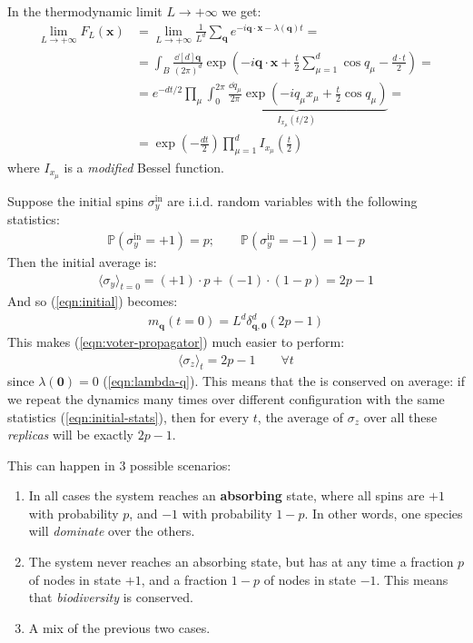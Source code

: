 \documentclass[../../main.tex]{subfiles}
\begin{document}
\medskip

In the thermodynamic limit $L \to +\infty$ we get:
\begin{align*}
    \lim_{L \to +\infty} F_L(\bm{x}) &= \lim_{L \to +\infty} \frac{1}{L^d} \sum_{\bm{q}} e^{-i \bm{q} \cdot \bm{x} - \lambda(\bm{q})t}  =\\
    &= \int_B \frac{\dd[d]{\bm{q}}}{(2 \pi)^d} \exp\left(-i \bm{q} \cdot \bm{x} + \frac{t}{2} \sum_{\mu=1}^d \cos q_\mu - \frac{d \cdot t}{2}  \right) =\\
    &= e^{- dt/2} \prod_\mu \underbrace{\int_0^{2\pi} \frac{\dd{q_\mu}}{2 \pi} \exp\left(-i q_\mu x_\mu + \frac{t}{2} \cos q_\mu \right)}_{I_{x_\mu}(t/2)} =\\
    &= \exp\left(-\frac{d t}{2} \right)  \prod_{\mu=1}^d I_{x_\mu}\left(\frac{t}{2}\right)
\end{align*}
where $I_{x_\mu}$ is a \textit{modified} Bessel function. 

\medskip

Suppose the initial spins $\sigma_y^{\mathrm{in}}$ are i.i.d. random variables with the following statistics:
\begin{align}\label{eqn:initial-stats}
    \mathbb{P}(\sigma_y^{\mathrm{in}}=+1) = p; \qquad \mathbb{P}(\sigma_{y}^{\mathrm{in}}=-1) = 1-p
\end{align}
Then the initial average is:
\begin{align*}
    \langle \sigma_y \rangle_{t=0} = (+1) \cdot p + (-1) \cdot (1-p) = 2p - 1
\end{align*}
And so (\ref{eqn:initial}) becomes:
\begin{align*}
    m_{\bm{q}}(t=0) = L^d \delta^d_{\bm{q},\bm{0}} (2p-1)
\end{align*}
This makes (\ref{eqn:voter-propagator}) much easier to perform:
\begin{align}\label{eqn:conserv}
    \langle \sigma_z \rangle_t = 2 p -1 \qquad \forall t
\end{align}
since $\lambda(\bm{0}) = 0$ (\ref{eqn:lambda-q}). This means that the  is conserved on average: if we repeat the dynamics many times over different configuration with the same statistics (\ref{eqn:initial-stats}), then for every $t$, the average of $\sigma_z$ over all these \textit{replicas} will be exactly $2p - 1$.

\medskip

This can happen in $3$ possible scenarios:
\begin{enumerate}
    \item In all cases the system reaches an \textbf{absorbing} state, where all spins are $+1$ with probability $p$, and $-1$ with probability $1-p$. In other words, one species will \textit{dominate} over the others. 
    \item The system never reaches an absorbing state, but has at any time a fraction $p$ of nodes in state $+1$, and a fraction $1-p$ of nodes in state $-1$. This means that \textit{biodiversity} is conserved. 
    \item A mix of the previous two cases.
\end{enumerate}
\end{document}
